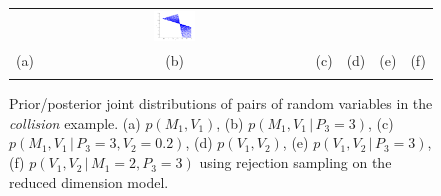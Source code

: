 \documentclass{article}
\newcommand{\pr}{p}
\newcommand{\nn}{0.16}
\begin{document}
{\begin{figure}[t!]
\begin{center}
\begin{tabular}{cccccc}
& \hspace{-3mm} \includegraphics[width=\nn\textwidth]{Figs/colV1V2givenPis3M1is2.png}
\vspace{-1.5mm}
\\
   \hspace{-5mm} \footnotesize(a) 
& \hspace{-4mm} \footnotesize(b) 
& \hspace{-3mm} \footnotesize(c) 
&\hspace{-1mm} \footnotesize(d) 
&\hspace{-1mm} \footnotesize(e) 
&\hspace{-1mm} \footnotesize(f)\\
\multicolumn{6}{c}{}
\end{tabular}
\end{center}
\vspace{-8mm}
\caption{\footnotesize
Prior/posterior joint distributions of pairs of random variables in the \emph{collision} example. 
(a) $\pr(M_1, V_1)$,
(b) $\pr(M_1, V_1 \, | \, P_3 = 3)$,
(c) $\pr(M_1, V_1 \, | \, P_3 = 3, V_2 = 0.2)$,
(d) $\pr(V_1, V_2)$,
(e) $\pr(V_1, V_2 \, | \, P_3 = 3)$,
(f) $\pr(V_1, V_2 \, | \, M_1 =2, P_3 = 3)$
using rejection sampling on the reduced dimension model.
} 
\label{fig:mom}
\end{figure}


}
\end{document}
